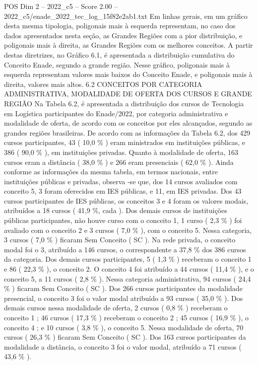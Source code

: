 \begin{textsample}{POS Dim 2 – 2022\_c5 – Score 2.00 – 2022\_c5/enade\_2022\_tec\_log\_15f82e2ab1.txt}
Em linhas gerais, em um gráfico desta mesma tipologia, poligonais mais à esquerda representam, no caso dos dados apresentados nesta seção, as Grandes Regiões com a pior distribuição, e poligonais mais à direita, as Grandes Regiões com os melhores conceitos.
A partir destas diretrizes, no Gráfico 6.1, é apresentada a distribuição cumulativa do Conceito Enade, segundo a grande região.
Nesse gráfico, poligonais mais à esquerda representam valores mais baixos do Conceito Enade, e poligonais mais à direita, valores mais altos. 6.2 CONCEITOS POR CATEGORIA ADMINISTRATIVA, MODALIDADE DE OFERTA DOS CURSOS E GRANDE REGIÃO Na Tabela 6.2, é apresentada a distribuição dos cursos de Tecnologia em Logística participantes do Enade/2022, por categoria administrativa e modalidade de oferta, de acordo com os conceitos por eles alcançados, segundo as grandes regiões brasileiras.
De acordo com as informações da Tabela 6.2, dos 429 cursos participantes, 43 ( 10,0 \% ) eram ministrados em instituições públicas, e 386 ( 90,0 \% ), em instituições privadas.
Quanto à modalidade de oferta, 163 cursos eram a distância ( 38,0 \% ) e 266 eram presenciais ( 62,0 \% ).
Ainda conforme as informações da mesma tabela, em termos nacionais, entre instituições públicas e privadas, observa -se que, dos 14 cursos avaliados com conceito 5, 3 foram oferecidos em IES públicas, e 11, em IES privadas.
Dos 43 cursos participantes de IES públicas, os conceitos 3 e 4 foram os valores modais, atribuídos a 18 cursos ( 41,9 \%, cada ).
Dos demais cursos de instituições públicas participantes, não houve curso com o conceito 1, 1 curso ( 2,3 \% ) foi avaliado com o conceito 2 e 3 cursos ( 7,0 \% ), com o conceito 5.
Nessa categoria, 3 cursos ( 7,0 \% ) ficaram Sem Conceito ( SC ).
Na rede privada, o conceito modal foi o 3, atribuído a 146 cursos, o correspondente a 37,8 \% dos 386 cursos da categoria.
Dos demais cursos participantes, 5 ( 1,3 \% ) receberam o conceito 1 e 86 ( 22,3 \% ), o conceito 2.
O conceito 4 foi atribuído a 44 cursos ( 11,4 \% ), e o conceito 5, a 11 cursos ( 2,8 \% ).
Nessa categoria administrativa, 94 cursos ( 24,4 \% ) ficaram Sem Conceito ( SC ).
Dos 266 cursos participantes da modalidade presencial, o conceito 3 foi o valor modal atribuído a 93 cursos ( 35,0 \% ).
Dos demais cursos nessa modalidade de oferta, 2 cursos ( 0,8 \% ) receberam o conceito 1 ; 46 cursos ( 17,3 \% ) receberam o conceito 2 ; 45 cursos ( 16,9 \% ), o conceito 4 ; e 10 cursos ( 3,8 \% ), o conceito 5.
Nessa modalidade de oferta, 70 cursos ( 26,3 \% ) ficaram Sem Conceito ( SC ).
Dos 163 cursos participantes da modalidade a distância, o conceito 3 foi o valor modal, atribuído a 71 cursos ( 43,6 \% ).

\end{textsample}
